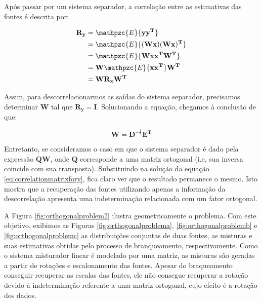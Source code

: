     Após passar por um sistema separador, a correlação entre as estimativas das fontes é descrita por:
    
        \begin{equation}
        \label{eq:correlationmatrixfory}
        \begin{split}
        \mathbf{R_y} & = \mathpzc{E}\{\mathbf{yy^T}\}\\
                     & = \mathpzc{E}\{\mathbf{(Wx)(Wx)^T}\}\\
                     & = \mathpzc{E}\{\mathbf{Wxx^TW^T}\} \\
                     & = \mathbf{W}\mathpzc{E}\{\mathbf{xx^T}\}\mathbf{W^T} \\
                     & = \mathbf{W}\mathbf{R_x}\mathbf{W^T} \\
        \end{split}
    \end{equation}
    
    Assim, para descorrelacionarmos as saídas do sistema separador, precisamos determinar $\mathbf{W}$ tal que $\mathbf{R_y = I}$. Solucionando a equação, chegamos à conclusão de que:
    
    \begin{equation}
        \label{separationmatrixsolution}
        \mathbf{W} = \mathbf{D}^{-\frac{1}{2}}\mathbf{E^T}
    \end{equation}
    
    Entretanto, se consideramos o caso em que o sistema separador é dado pela expressão $\mathbf{QW}$, onde $\mathbf{Q}$ corresponde a uma matriz ortogonal (i.e, sua inversa coincide com sua transposta). Substituindo na solução da equação \ref{eq:correlationmatrixfory}, fica claro ver que o resultado permanece o mesmo. Isto mostra que a recuperação das fontes utilizando apenas a informação da descorrelação apresenta uma indeterminação relacionada com um fator ortogonal.
    
    A Figura \ref{fig:orthogonalproblem2} ilustra geometricamente o problema. Com este objetivo, exibimos as Figuras \ref{fig:orthogonalproblema}, \ref{fig:orthogonalproblemb} e \ref{fig:orthogonalproblemc} as distribuições conjuntas de duas fontes, as misturas e suas estimativas obtidas pelo processo de branqueamento, respectivamente. Como o sistema misturador linear é modelado por uma matriz, as misturas são geradas a partir de rotações e escalonamento das fontes. Apesar do braqueamento conseguir recuperar as escalas das fontes, ele não consegue recuperar a rotação devido à indeterminação referente a uma matriz ortogonal, cujo efeito é a rotação dos dados.
    

